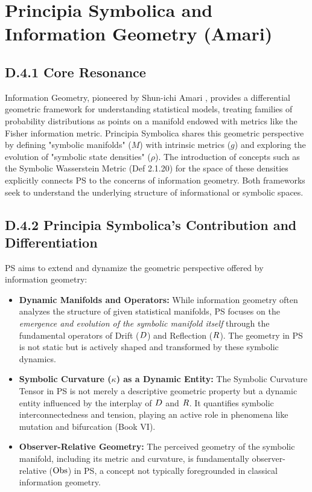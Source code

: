 \section*{Principia Symbolica and Information Geometry (Amari)} \label{sec:appD_ps_and_info_geometry_amari}
\subsection*{D.4.1 Core Resonance}
\label{subsec:appD_info_geometry_core_resonance}
Information Geometry, pioneered by Shun-ichi Amari \cite{amari2000}, provides a differential geometric framework for understanding statistical models, treating families of probability distributions as points on a manifold endowed with metrics like the Fisher information metric. Principia Symbolica shares this geometric perspective by defining "symbolic manifolds" (\(M\)) with intrinsic metrics (\(g\)) and exploring the evolution of "symbolic state densities" (\(\rho\)). The introduction of concepts such as the Symbolic Wasserstein Metric (Def 2.1.20) for the space of these densities explicitly connects PS to the concerns of information geometry. Both frameworks seek to understand the underlying structure of informational or symbolic spaces.
\subsection*{D.4.2 Principia Symbolica's Contribution and Differentiation} \label{subsec:appD_info_geometry_contribution_differentiation}
PS aims to extend and dynamize the geometric perspective offered by information geometry:
\begin{itemize}
    \item \textbf{Dynamic Manifolds and Operators:} While information geometry often analyzes the structure of given statistical manifolds, PS focuses on the \emph{emergence and evolution of the symbolic manifold itself} through the fundamental operators of Drift (\(D\)) and Reflection (\(R\)). The geometry in PS is not static but is actively shaped and transformed by these symbolic dynamics.
    \item \textbf{Symbolic Curvature (\(\kappa\)) as a Dynamic Entity:} The Symbolic Curvature Tensor in PS is not merely a descriptive geometric property but a dynamic entity influenced by the interplay of \(D\) and \(R\). It quantifies symbolic interconnectedness and tension, playing an active role in phenomena like mutation and bifurcation (Book VI).
    \item \textbf{Observer-Relative Geometry:} The perceived geometry of the symbolic manifold, including its metric and curvature, is fundamentally observer-relative (\(\mathrm{Obs}\)) in PS, a concept not typically foregrounded in classical information geometry.
\end{itemize}
